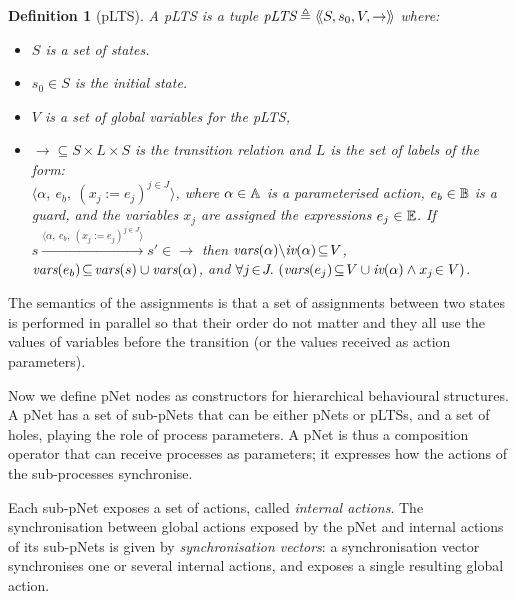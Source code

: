 \documentclass{lmcs}
\newcommand{\LUDO}[1]{\textcolor{darkgreen}{#1}}
\newtheorem{definition}{Definition}
\begin{document}
\begin{definition}[pLTS]
\label{pLTS}
A pLTS is a tuple
$\pLTS\triangleq\mylangle S,s_0, V, \to\myrangle$ where:
\begin{itemize}
\item[$\bullet$]
$S$ is a set of states.
\item[$\bullet$]
$s_0 \in S$ is the initial state.
\item[$\bullet$] $V$ is a set of global variables for the pLTS,
\item[$\bullet$] $\to \subseteq S \times L \times S$ is the transition relation and 
$L$ is the set of labels of the form:\\
$\langle \alpha,~e_b,~(x_j\!:= {e}_j)^{j\in J}\rangle$,
where $\alpha \in\mathbb{A}$ is a parameterised action, $e_b \in
\mathbb{B}$ is a guard, and the variables $x_j$ 
are assigned the expressions $e_j\in \mathbb{E}$.
If 
$s \xrightarrow{\langle \alpha,~e_b,~(x_j\!:= {e}_j)^{j\in
		J}\rangle} s'\in \to $ then 
		$\vars(\alpha)\backslash \iv(\alpha)\!\subseteq\! V$, 
		$\vars(e_b)\!\subseteq\! \vars(s)\cup\vars(\alpha)$, and
		$\forall j\!\in\! J .\,\left(\vars(e_j)\!\subseteq\! V\cup\iv(\alpha)\land 
		x_j\!\in V \right)$. %

\end{itemize}
\end{definition}

The semantics of the assignments is that a set of assignments between two states is performed in parallel so that their order do not matter and they all use the values of variables before the transition (or the values received as action parameters).


Now we define
pNet nodes as constructors for hierarchical behavioural structures.
A pNet has a set of sub-pNets that can be either pNets or pLTSs, and a
set of holes, playing the role of process parameters. A pNet is thus a composition operator that can receive processes as parameters; it expresses how the actions of the sub-processes synchronise.

Each sub-pNet exposes
a set of actions, called \emph{internal actions}. The synchronisation between global actions exposed by the pNet and
internal actions of its sub-pNets is given by  \emph{synchronisation vectors}: a
synchronisation vector synchronises one or several internal actions, and
exposes a single resulting global action.
\end{document}
